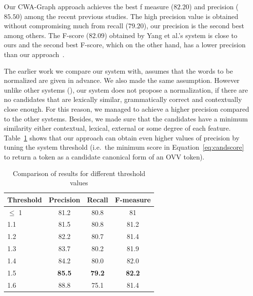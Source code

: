 \documentclass[a4paper,onesided,12pt]{report}
\begin{document}
Our CWA-Graph approach achieves the best f measure ($82.20$) and precision ($85.50$) among the recent previous studies. The high precision value is obtained without compromising much from recall ($79.20$), our precision is the second best among others. The F-score ($82.09$) obtained by Yang et al.'s system is close to ours and the second best F-score, which on the other hand, has a lower precision than our approach~\cite{DBLP:conf/emnlp/YangE13}.

The earlier work we compare our system with, assumes that the words to be normalized are given in advance. We also made the same assumption. However unlike other systems (\cite{DBLP:conf/emnlp/YangE13,liu2012broad,Han:2011:LNS:2002472.2002520}), our system does not propose a normalization, if there are no candidates that are lexically similar, grammatically correct and contextually close enough. For this reason, we managed to achieve a higher precision compared to the other systems. Besides, we made sure that the candidates have a minimum similarity either contextual, lexical, external or some degree of each feature. Table~\ref{tab:thresholds} shows that our approach can obtain even higher values of precision by tuning the system threshold (i.e.~the minimum score in Equation~\ref{eq:candscore} to return a token as a candidate canonical form of an OVV token).

\begin{table}[thb]
  \caption{Comparison of results for different threshold values}
  \centering
  \begin{tabular}[th]{lccc}
    \hline
    Threshold & Precision & Recall & F-measure \\
    \hline
    $\leq$ 1 & 81.2 &	80.8 &	81 \\
    1.1 & 81.5 & 80.8 &	81.2 \\
    1.2 & 82.2 &	80.7 &	81.4 \\
    1.3 & 83.7 &	80.2 &	81.9 \\
    1.4 & 84.2 &	80.0 &	82.0 \\
    1.5 & \textbf{85.5} &  \textbf{79.2} &  \textbf{82.2} \\
    1.6 & 88.8	& 75.1	& 81.4 \\
    \hline
  \end{tabular}
\label{tab:thresholds}
\end{table}
\end{document}
